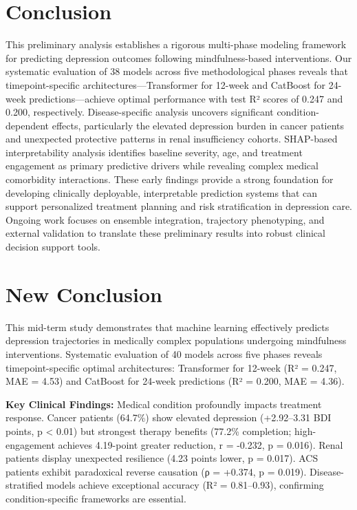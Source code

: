 \documentclass[conference]{IEEEtran}
\begin{document}
\section{Conclusion}

This preliminary analysis establishes a rigorous multi-phase modeling framework for predicting depression outcomes following mindfulness-based interventions. Our systematic evaluation of 38 models across five methodological phases reveals that timepoint-specific architectures—Transformer for 12-week and CatBoost for 24-week predictions—achieve optimal performance with test R² scores of 0.247 and 0.200, respectively. Disease-specific analysis uncovers significant condition-dependent effects, particularly the elevated depression burden in cancer patients and unexpected protective patterns in renal insufficiency cohorts. SHAP-based interpretability analysis identifies baseline severity, age, and treatment engagement as primary predictive drivers while revealing complex medical comorbidity interactions. These early findings provide a strong foundation for developing clinically deployable, interpretable prediction systems that can support personalized treatment planning and risk stratification in depression care. Ongoing work focuses on ensemble integration, trajectory phenotyping, and external validation to translate these preliminary results into robust clinical decision support tools.

\section{New Conclusion}

This mid-term study demonstrates that machine learning effectively predicts depression trajectories in medically complex populations undergoing mindfulness interventions. Systematic evaluation of 40 models across five phases reveals timepoint-specific optimal architectures: Transformer for 12-week (R² = 0.247, MAE = 4.53) and CatBoost for 24-week predictions (R² = 0.200, MAE = 4.36).

\textbf{Key Clinical Findings:} Medical condition profoundly impacts treatment response. Cancer patients (64.7\%) show elevated depression (+2.92–3.31 BDI points, p < 0.01) but strongest therapy benefits (77.2\% completion; high-engagement achieves 4.19-point greater reduction, r = -0.232, p = 0.016). Renal patients display unexpected resilience (4.23 points lower, p = 0.017). ACS patients exhibit paradoxical reverse causation (ρ = +0.374, p = 0.019). Disease-stratified models achieve exceptional accuracy (R² = 0.81–0.93), confirming condition-specific frameworks are essential.
\end{document}
